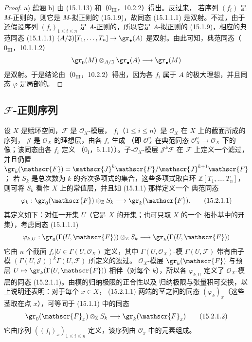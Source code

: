\begin{proof}
a) 蕴涵 b) 由 (15.1.13) 和（$0_{\mathrm{III}}$，10.2.2）得出。反过来，
若序列 $(f_i)$ 是 $M$-正则的，则它是 $M$-拟正则的 (15.1.9)，故同态
(15.1.1.1) 是双射。不过，由于还假设序列 $(f_i)_{1\leq i\leq n}$ 是
$A$-正则的，所以它是 $A$-拟正则的 (15.1.9)，相应的典范同态 (15.1.1.1)
$(A/\mathfrak{J})[T_1,\ldots,T_n]\to\gr_\bullet(A)$
是双射。由此可知，典范同态（$0_{\mathrm{III}}$，10.1.1.2）
\[
  \gr_0(M)\otimes_{A/\mathfrak{J}}\gr_\bullet(A)
  \longrightarrow\gr_\bullet(M)
\]
是双射。于是结论由（$0_{\mathrm{III}}$，10.2.2）得出，因为各 $f_i$
属于 $A$ 的极大理想，并且同态 $\varphi$ 是局部的。
\end{proof}

\subsection{\texorpdfstring{$\mathscr{F}$}{F}-正则序列}
\label{subsection:0.15.2-fr}

\begin{env}[15.2.1]
\label{0.15.2.1-fr}
设 $X$ 是赋环空间，$\mathscr{F}$ 是 $\mathcal{O}_X$-模层，
$f_i$（$1\leq i\leq n$）是 $\mathcal{O}_X$ 在 $X$ 上的截面所成的序列，
$\mathscr{J}$ 是 $\mathcal{O}_X$ 的理想层，由各 $f_i$ 生成
（即 $\mathcal{O}_X^n$ 在典范同态
$\mathcal{O}_X^n\to\mathcal{O}_X$ 下的像；该同态由各 $f_i$ 定义
（$0_{\mathrm I}$，5.1.1））。子-$\mathcal{O}_X$-模层
$\mathscr{J}^k\mathscr{F}$ 在 $\mathscr{F}$ 上定义一个滤过，并且仍置
$\gr_k(\mathscr{F})=\mathscr{J}^k\mathscr{F}/\mathscr{J}^{k+1}\mathscr{F}$；
若 $S_k$ 是总次数为 $k$ 的齐次多项式的集合，这些多项式取自环
$\mathbb{Z}[T_1,\ldots,T_n]$，则可将 $S_k$ 看作 $X$ 上的常值层，并且如
(15.1.1) 那样定义一个
典范同态
\[
\label{0.15.2.1.1-fr}
  \varphi_k:\gr_0(\mathscr{F})\otimes_{\mathbb Z}S_k
  \longrightarrow\gr_k(\mathscr{F}).
\tag{15.2.1.1}
\]
其定义如下：对任一开集 $U$（它是 $X$ 的开集；也可只取 $X$ 的一个
拓扑基中的开集），考虑同态 (15.1.1.1)
\[
  \varphi_{k,U}:\gr_0(\Gamma(U,\mathscr{F}))\otimes_{\mathbb Z}S_k
  \longrightarrow\gr_k(\Gamma(U,\mathscr{F}))
\]
它由 $n$ 个截面 $f_i|U\in\Gamma(U,\mathcal{O}_X)$ 定义，其中
$\Gamma(U,\mathcal{O}_X)$-模 $\Gamma(U,\mathscr{F})$ 带有由子模
$(\Gamma(U,\mathscr{J}))^k\Gamma(U,\mathscr{F})$ 所定义的滤过。
$\mathcal{O}_X$-模层 $\gr_k(\mathscr{F})$ 与预层
$U\mapsto\gr_k(\Gamma(U,\mathscr{F}))$ 相伴（对每个 $k$），所以各 $\varphi_{k,U}$
定义了 $\mathcal{O}_X$-模层的同态 (15.2.1.1)。由模的归纳极限的正合性以及
归纳极限与张量积可交换，以上说明还表明：对于每个 $x\in X$，
(15.2.1.1) 两端的茎之间的同态 $(\varphi_k)_x$（这些茎取在点 $x$），可等同于
(15.1.1) 中的同态
\[
\label{0.15.2.1.2-fr}
  \gr_0(\mathscr{F}_x)\otimes_{\mathbb Z}S_k
  \longrightarrow\gr_k(\mathscr{F}_x)
\tag{15.2.1.2}
\]
它由序列 $((f_i)_x)_{1\leq i\leq n}$ 定义，该序列由
$\mathcal{O}_x$ 中的元素组成。
\end{env}

